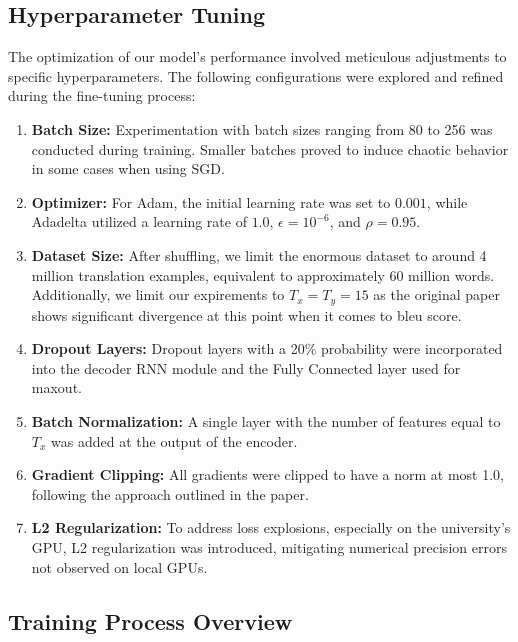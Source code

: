 \subsection{Hyperparameter Tuning}

The optimization of our model's performance involved meticulous adjustments to specific hyperparameters. The following configurations were explored and refined during the fine-tuning process:

\begin{enumerate}
    \item \textbf{Batch Size:} Experimentation with batch sizes ranging from 80 to 256 was conducted during training. Smaller batches proved to induce chaotic behavior in some cases when using SGD.
    
    \item \textbf{Optimizer:} For Adam, the initial learning rate was set to $0.001$, while Adadelta utilized a learning rate of $1.0$, $\epsilon=10^{-6}$, and $\rho=0.95$.
    
    \item \textbf{Dataset Size:} After shuffling, we limit the enormous dataset to around 4 million translation examples, equivalent to approximately 60 million words. Additionally, we limit our expirements to $T_x=T_y=15$ as the original paper shows significant divergence at this point when it comes to bleu score. 
    
    \item \textbf{Dropout Layers:} Dropout layers with a 20\% probability were incorporated into the decoder RNN module and the Fully Connected layer used for maxout.
    
    \item \textbf{Batch Normalization:} A single layer with the number of features equal to $T_x$ was added at the output of the encoder.
    
    \item \textbf{Gradient Clipping:} All gradients were clipped to have a norm at most 1.0, following the approach outlined in the paper.
    
    \item \textbf{L2 Regularization:} To address loss explosions, especially on the university's GPU, L2 regularization was introduced, mitigating numerical precision errors not observed on local GPUs.
\end{enumerate}

\subsection{Training Process Overview}

